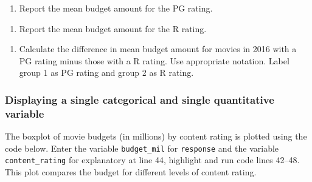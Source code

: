 \documentclass[
]{report}
\providecommand{\tightlist}{%
  \setlength{\itemsep}{0pt}\setlength{\parskip}{0pt}}
\begin{document}
\vspace{0.8in}

\begin{enumerate}
\def\labelenumi{\arabic{enumi}.}
\setcounter{enumi}{11}
\tightlist
\item
  Report the mean budget amount for the PG rating.
\end{enumerate}

\vspace{0.3in}

\begin{enumerate}
\def\labelenumi{\arabic{enumi}.}
\setcounter{enumi}{12}
\tightlist
\item
  Report the mean budget amount for the R rating.
\end{enumerate}

\vspace{0.3in}

\begin{enumerate}
\def\labelenumi{\arabic{enumi}.}
\setcounter{enumi}{13}
\tightlist
\item
  Calculate the difference in mean budget amount for movies in 2016 with a PG rating minus those with a R rating. Use appropriate notation. Label group 1 as PG rating and group 2 as R rating.
\end{enumerate}

\vspace{0.8in}

\hypertarget{displaying-a-single-categorical-and-single-quantitative-variable}{%
\subsubsection*{Displaying a single categorical and single quantitative variable}\label{displaying-a-single-categorical-and-single-quantitative-variable}}

The boxplot of movie budgets (in millions) by content rating is plotted using the code below. Enter the variable \texttt{budget\_mil} for \texttt{response} and the variable \texttt{content\_rating} for explanatory at line 44, highlight and run code lines 42--48. This plot compares the budget for different levels of content rating.
\end{document}
